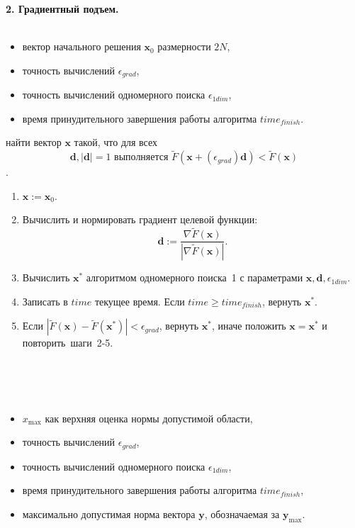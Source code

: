 { \textbf{2. Градиентный подъем.}}
\\ \\
\begin{itemize}
  \item вектор начального решения $\textbf{x}_0$ размерности $2N$,
  \item точность вычислений $\epsilon_{grad}$,
  \item точность вычислений одномерного поиска $\epsilon_{1dim}$,
  \item время принудительного завершения работы алгоритма $time_{finish}.$\\
\end{itemize}
 найти вектор $\textbf{x}$ такой, что
для всех $$\textbf{d}, |\textbf{d}| = 1 \text{~выполняется~} \tilde{F}(\textbf{x} + (\epsilon_{grad})\textbf{d}) < \tilde{F}(\textbf{x})$$.\\
\begin{enumerate}
  \item $\textbf{x} := \textbf{x}_0.$
  \item Вычислить и нормировать градиент целевой функции:
   $$\textbf{d} := \frac{\nabla \tilde{F}(\textbf{x})}{|\nabla \tilde{F}(\textbf{x})|}.$$
  \item Вычислить $\textbf{x}^{*}$ алгоритмом одномерного поиска~1 с параметрами $\textbf{x}, \textbf{d}, \epsilon_{1dim}.$
  \item Записать в $time$ текущее время. Если $time \geq time_{finish}$, вернуть $\textbf{x}^{*}$.
  \item Если $|\tilde{F}(\textbf{x}) - \tilde{F}(\textbf{x}^{*})| < \epsilon_{grad}$, вернуть $\textbf{x}^{*}$, иначе положить $\textbf{x} = \textbf{x}^{*}$ и повторить~шаги~2-5.\\ \\
\end{enumerate}

\\ \\
\begin{itemize}
  \item $x_{\max}$ как верхняя оценка нормы допустимой области,
  \item точность вычислений $\epsilon_{grad}$,
  \item точность вычислений одномерного поиска $\epsilon_{1dim}$,
  \item время принудительного завершения работы алгоритма $time_{finish}$,
  \item максимально допустимая норма вектора ${\textbf{y}}$, обозначаемая за ${\textbf{y}}_{\max}$.\\
\end{itemize}

